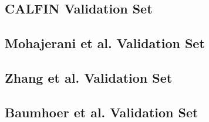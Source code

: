 \documentclass[tc,manuscript]{copernicus}
\begin{document}
\subsection{CALFIN Validation Set}
\subsection{Mohajerani et al. Validation Set}
\subsection{Zhang et al. Validation Set}
\subsection{Baumhoer et al. Validation Set}
\end{document}
